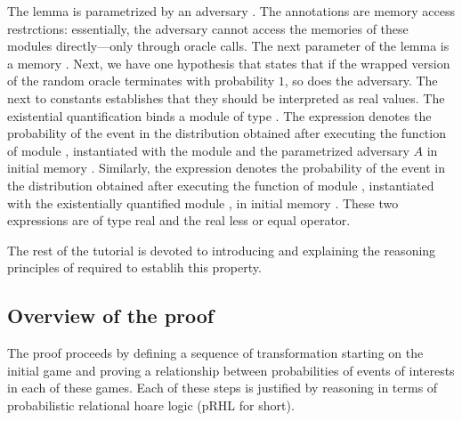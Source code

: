The lemma  is parametrized by an adversary . The
annotations  are memory access restrctions:
essentially, the adversary cannot access the memories of these modules
directly---only through oracle calls. The next parameter of the lemma
is a memory . Next, we have one hypothesis that states that if
the wrapped version of the random oracle terminates with probability
$1$, so does the adversary. The  next to constants establishes
that they should be interpreted as real values. The existential
quantification binds a module  of type . The
expression  denotes the
probability of the event  in the distribution obtained after
executing the  function of module , instantiated with
the module  and the parametrized adversary $A$ in initial
memory . Similarly, the expression  denotes the probability of the event  in the
distribution obtained after executing the  function of module
, instantiated with the existentially quantified module ,
in initial memory . These two expressions are of type real and
the \ec{<=} real less or equal operator.

The rest of the tutorial is devoted to introducing and explaining the
reasoning principles of \EC required to establih this property.

\subsection{Overview of the proof}
The proof proceeds by defining a sequence of transformation starting
on the initial game and proving a relationship between probabilities
of events of interests in each of these games. Each of these steps is
justified by reasoning in terms of probabilistic relational hoare
logic (pRHL for short).

